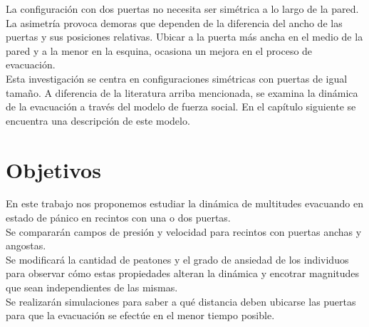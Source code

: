 La configuración con dos puertas no necesita ser simétrica a lo largo de la pared. La asimetría provoca demoras que dependen de la diferencia del ancho de las puertas y sus posiciones relativas. Ubicar a la puerta más ancha en el medio de la pared y a la menor en la esquina, ocasiona un mejora en el proceso de evacuación\cite{huanhuan1}.\\

Esta investigación se centra en configuraciones simétricas con puertas de igual tamaño. A diferencia de la literatura arriba mencionada, se examina la dinámica de la evacuación a través del modelo de fuerza social. En el capítulo siguiente se encuentra una descripción de este modelo. \\

\newpage

\section{Objetivos}

En este trabajo nos proponemos estudiar la dinámica de multitudes evacuando en estado de  pánico en recintos con una o dos puertas.\\ 

Se compararán campos de presión y velocidad para recintos con puertas anchas y angostas.\\

Se modificará la cantidad de peatones y el grado de ansiedad de los individuos para observar cómo estas propiedades alteran la dinámica y encotrar magnitudes que sean independientes de las mismas.\\

Se realizarán simulaciones para saber a qué distancia deben ubicarse las puertas para que la evacuación se efectúe en el menor tiempo posible.


